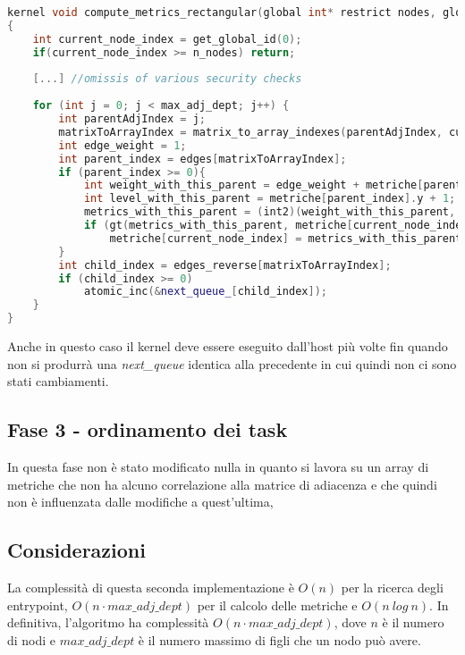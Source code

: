 \documentclass[../relazione.tex]{subfiles}
\begin{document}
\clearpage
\begin{lstlisting}[language=C++, caption={Compute metrics kernel II},captionpos=b]
kernel void compute_metrics_rectangular(global int* restrict nodes, global int* queue_, global int* next_queue_, const int n_nodes, global edge_t* restrict edges, global edge_t* restrict edges_reverse, volatile global int2* metriche, const int max_adj_dept)
{
	int current_node_index = get_global_id(0);
	if(current_node_index >= n_nodes) return;
	
	[...] //omissis of various security checks
	
	for (int j = 0; j < max_adj_dept; j++) {
		int parentAdjIndex = j;
		matrixToArrayIndex = matrix_to_array_indexes(parentAdjIndex, current_node_index, n_nodes);
		int edge_weight = 1;
		int parent_index = edges[matrixToArrayIndex];
		if (parent_index >= 0){
			int weight_with_this_parent = edge_weight + metriche[parent_index].x + nodes[current_node_index];
			int level_with_this_parent = metriche[parent_index].y + 1;
			metrics_with_this_parent = (int2)(weight_with_this_parent, level_with_this_parent);
			if (gt(metrics_with_this_parent, metriche[current_node_index]))
				metriche[current_node_index] = metrics_with_this_parent;
		}
		int child_index = edges_reverse[matrixToArrayIndex];
		if (child_index >= 0)
			atomic_inc(&next_queue_[child_index]);
	}
}
\end{lstlisting}

Anche in questo caso il kernel deve essere eseguito dall'host più volte fin quando non si produrrà una \textit{next\_queue} identica alla precedente in cui quindi non ci sono stati cambiamenti.

\subsection{Fase 3 - ordinamento dei task}
In questa fase non è stato modificato nulla in quanto si lavora su un array di metriche che non ha alcuno correlazione alla matrice di adiacenza e che quindi non è influenzata dalle modifiche a quest'ultima,

\subsection{Considerazioni}
La complessità di questa seconda implementazione è $O(n)$ per la ricerca degli entrypoint, $O(n \cdot max\_adj\_dept)$ per il calcolo delle metriche e $O(n\ log\ n)$.
In definitiva, l'algoritmo ha complessità $O(n \cdot max\_adj\_dept)$, dove $n$ è il numero di nodi e $max\_adj\_dept$ è il numero massimo di figli che un nodo può avere.
\end{document}
